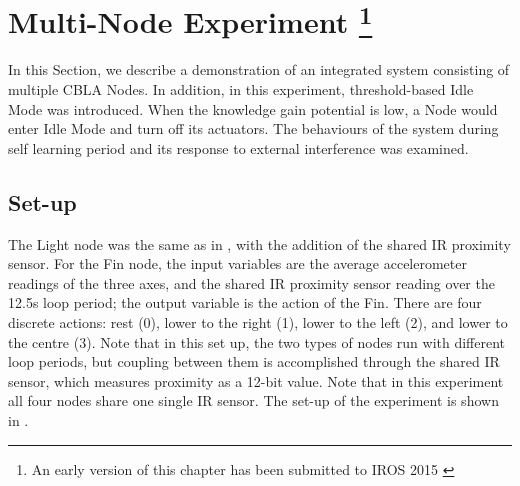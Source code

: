 \FloatBarrier

\section[Multi-Node Experiment]
{Multi-Node Experiment
	\footnote{An early version of this chapter has been submitted to IROS 2015 \cite{Chan2015} }} 


In this Section, we describe a demonstration of an integrated system consisting of multiple CBLA Nodes. In addition, in this experiment, threshold-based Idle Mode was introduced. When the knowledge gain potential is low, a Node would enter Idle Mode and turn off its actuators. The behaviours of the system during self learning period and its response to external interference was examined.

\subsection{Set-up}
The Light node was the same as in , with the addition of the shared IR proximity sensor. For the Fin node, the input variables are the average accelerometer readings of the three axes, and the shared IR proximity sensor reading over the 12.5s loop period; the output variable is the action of the Fin. There are four discrete actions: rest (0), lower to the right (1), lower to the left (2), and lower to the centre (3). Note that in this set up, the two types of nodes run with different loop periods, but coupling between them is accomplished through the shared IR sensor, which measures proximity as a 12-bit value. Note that in this experiment all four nodes share one single IR sensor. The set-up of the experiment is shown in .

